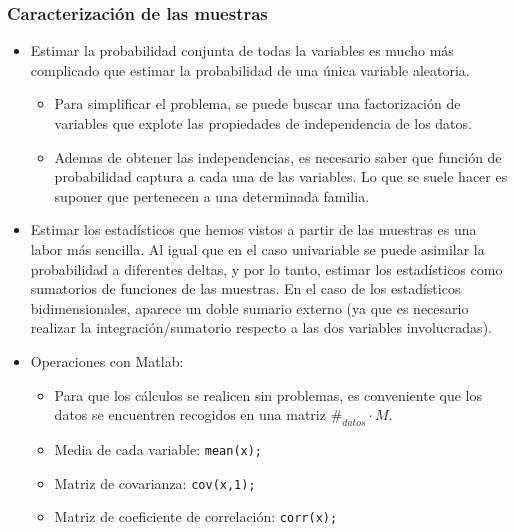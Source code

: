 \documentclass{beamer}
\numberwithin{section}{part}
\begin{document}
\begin{frame}
  \frametitle{Caracterización de las muestras}

  \vspace{-0.2cm}

  \footnotesize
  \begin{itemize}
    \item Estimar la probabilidad conjunta de todas la variables es mucho más complicado que estimar la probabilidad de una única variable aleatoria. 
    \begin{itemize}
      \footnotesize
      \item Para simplificar el problema, se puede buscar una factorización de variables que explote las propiedades de independencia de los datos. 
      \item Ademas de obtener las independencias, es necesario saber que función de probabilidad captura a cada una de las variables. Lo que se suele hacer es suponer que pertenecen a una determinada familia.
    \end{itemize}
    \item Estimar los estadísticos que hemos vistos a partir de las muestras es una labor más sencilla. Al igual que en el caso univariable se puede asimilar la probabilidad a diferentes deltas, y por lo tanto, estimar los estadísticos como sumatorios de funciones de las muestras. En el caso de los estadísticos bidimensionales, aparece un doble sumario externo (ya que es necesario realizar la integración/sumatorio respecto a las dos variables involucradas).
    \item Operaciones con Matlab:
    \begin{itemize}
      \footnotesize
      \item Para que los cálculos se realicen sin problemas, es conveniente que los datos se encuentren recogidos en una matriz $\#_{datos}\cdot M$.
      \item Media de cada variable: \color{blue}\texttt{mean(x);}\color{black}
      \item Matriz de covarianza: \color{blue}\texttt{cov(x,1);}\color{black}
      \item Matriz de coeficiente de correlación: \color{blue}\texttt{corr(x);}\color{black}
    \end{itemize}
  \end{itemize}
\end{frame}
\end{document}

